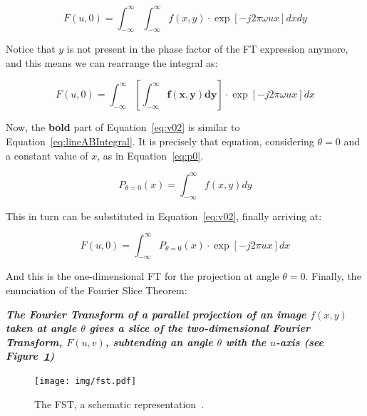 \begin{equation}
    \label{eq:v0}
    F(u, 0) = \int_{-\infty}^{\infty} \int_{-\infty}^{\infty} f(x, y)
    \cdot \exp \left[  -j 2\pi  \omega ux \right] dx dy
\end{equation}

Notice that $y$ is not present in the phase factor of the \gls{FT}
expression anymore, and this means we can rearrange the integral as:

\begin{equation}
    \label{eq:v02}
    F(u, 0) = \int_{-\infty}^{\infty} \left[ \mathbf{\int_{-\infty}^{\infty}
    f(x, y) dy }\right] \cdot \exp \left[  -j 2\pi  \omega ux \right] dx 
\end{equation}

Now, the \textbf{bold} part of Equation~\ref{eq:v02} is similar to
Equation~\ref{eq:lineABIntegral}. It is precisely that equation,
considering $\theta=0$ and a constant value of $x$, as in
Equation~\ref{eq:p0}.

\begin{equation}
    \label{eq:p0}
    P_{\theta=0} (x) = \int_{-\infty}^{\infty} f(x, y) dy
\end{equation}

This in turn can be substituted in Equation~\ref{eq:v02}, finally
arriving at:

\begin{equation}
    \label{eq:FTP}
    F(u, 0) = \int_{-\infty}^{\infty} P_{\theta=0} (x) \cdot \exp \left[
    -j 2\pi ux \right] dx
\end{equation}

And this is the one-dimensional \gls{FT} for the projection at angle
$\theta=0$. Finally, the enunciation of the Fourier Slice Theorem:
\begin{center}
    \begin{minipage}{0.8\textwidth}

        \noindent\textbf{\emph{The Fourier Transform of a parallel
                projection  of an image $f(x, y)$ taken at angle
                $\theta$ gives a slice of the two-dimensional Fourier
                Transform, $F(u, v)$, subtending an angle $\theta$ with
                the $u$-axis (see Figure~\ref{fig:fst})}}

    \end{minipage}
\end{center}

\begin{figure}[htpb]
    \centering
    \texttt{[image: img/fst.pdf]}
    \caption{The \gls{FST}, a schematic
    representation~\cite{Asl2013a}.}
    \label{fig:fst}
\end{figure}

